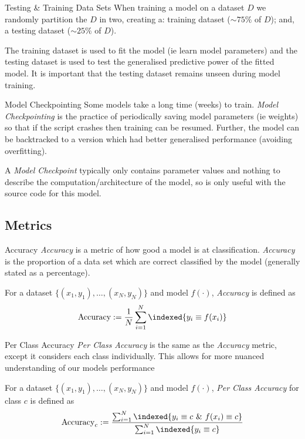 \documentclass[11pt,a4paper]{article}
\begin{document}
  \begin{proposition}{Testing \& Training Data Sets}
    When training a model on a dataset $D$ we randomly partition the $D$ in two, creating a: training dataset ($\sim75\%$ of $D$); and, a testing dataset ($\sim25\%$ of $D$).
    \par The training dataset is used to fit the model (ie learn model parameters) and the testing dataset is used to test the generalised predictive power of the fitted model. It is important that the testing dataset remains unseen during model training.
  \end{proposition}

  \begin{definition}{Model Checkpointing}
    Some models take a long time (weeks) to train. \textit{Model Checkpointing} is the practice of periodically saving model parameters (ie weights) so that if the script crashes then training can be resumed. Further, the model can be backtracked to a version which had better generalised performance (avoiding overfitting).
    \par A \textit{Model Checkpoint} typically only contains parameter values and nothing to describe the computation/architecture of the model, so is only useful with the source code for this model.
  \end{definition}

\subsection{Metrics} \label{sec_Metrics}

  \begin{definition}{Accuracy}
    \textit{Accuracy} is a metric of how good a model is at classification. \textit{Accuracy} is the proportion of a data set which are correct classified by the model (generally stated as a percentage).
    \par For a dataset $\{(x_1,y_1),\dots,(x_N,y_N)\}$ and model $f(\cdot)$, \textit{Accuracy} is defined as
    \[ \text{Accuracy}:=\frac1N\sum_{i=1}^N\indexed\{y_i\equiv f(x_i)\} \]
  \end{definition}

  \begin{definition}{Per Class Accuracy}
    \textit{Per Class Accuracy} is the same as the \textit{Accuracy} metric, except it considers each class individually. This allows for more nuanced understanding of our models performance
    \par For a dataset $\{(x_1,y_1),\dots,(x_N,y_N)\}$ and model $f(\cdot)$, \textit{Per Class Accuracy} for class $c$ is defined as
    \[ \text{Accuracy}_c:=\frac{\sum_{i=1}^N\indexed\{y_i\equiv c\ \&\ f(x_i)\equiv c\}}{\sum_{i=1}^N\indexed\{y_i\equiv c\}} \]
  \end{definition}
\end{document}

